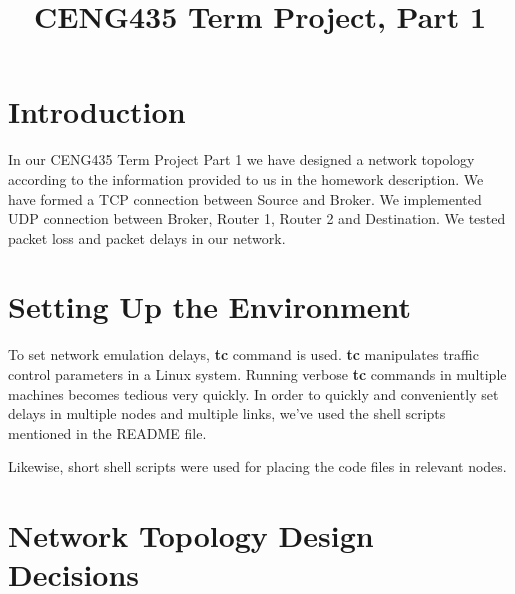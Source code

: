 \documentclass[conference]{IEEEtran}
\begin{document}
\title{CENG435 Term Project, Part 1\\
}

\author{
\IEEEauthorblockA{
}
\and
{}
\IEEEauthorblockA{
}
}

\maketitle

\section{Introduction}

In our CENG435 Term Project Part 1 we have designed a network topology according to the information provided to us in the homework description. We have formed a TCP connection between Source and Broker. We implemented UDP connection between Broker, Router 1, Router 2 and Destination. We tested packet loss and packet delays in our network.

\section{Setting Up the Environment}
To set network emulation delays, \textbf{tc} command is used. \textbf{tc} manipulates
traffic control parameters in a Linux system. Running verbose \textbf{tc} commands
in multiple machines becomes tedious very quickly.
In order to quickly and conveniently set delays in multiple nodes and multiple links,
we've used the shell scripts mentioned in the README file.

Likewise, short shell scripts were used for placing the code files in relevant
nodes.

\section{Network Topology Design Decisions}
\end{document}
